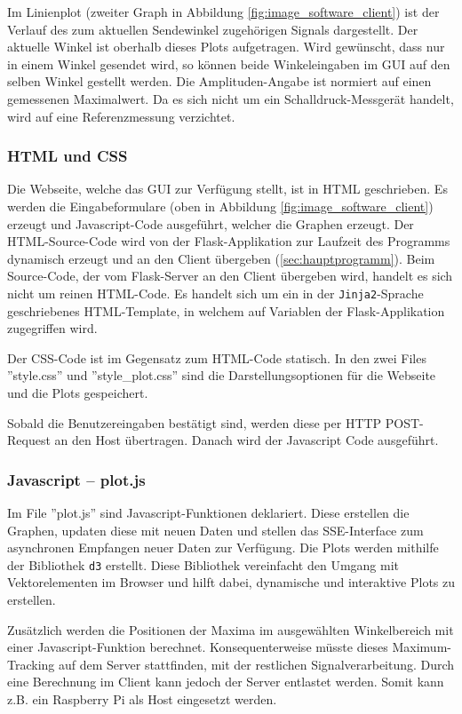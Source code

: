 Im Linienplot (zweiter Graph in Abbildung \ref{fig:image_software_client}) ist der Verlauf des zum aktuellen Sendewinkel zugehörigen Signals dargestellt. Der aktuelle Winkel ist oberhalb dieses Plots aufgetragen. Wird gewünscht, dass nur in einem Winkel gesendet wird, so können beide Winkeleingaben im GUI auf den selben Winkel gestellt werden. Die Amplituden-Angabe ist normiert auf einen gemessenen Maximalwert. Da es sich nicht um ein Schalldruck-Messgerät handelt, wird auf eine Referenzmessung verzichtet.

\subsubsection{HTML und CSS}\label{sec:html_und_css}
Die Webseite, welche das GUI zur Verfügung stellt, ist in HTML geschrieben. Es werden die Eingabeformulare (oben in Abbildung \ref{fig:image_software_client}) erzeugt und Javascript-Code ausgeführt, welcher die Graphen erzeugt.
Der HTML-Source-Code wird von der Flask-Applikation zur Laufzeit des Programms dynamisch erzeugt und an den Client übergeben (\ref{sec:hauptprogramm}). Beim Source-Code, der vom Flask-Server an den Client übergeben wird, handelt es sich nicht um reinen HTML-Code. Es handelt sich um ein in der \texttt{Jinja2}-Sprache geschriebenes HTML-Template, in welchem auf Variablen der Flask-Applikation zugegriffen wird.

Der CSS-Code ist im Gegensatz zum HTML-Code statisch. In den zwei Files ''style.css'' und ''style\_plot.css'' sind die Darstellungsoptionen für die Webseite und die Plots gespeichert.

Sobald die Benutzereingaben bestätigt sind, werden diese per HTTP POST-Request an den Host übertragen. Danach wird der Javascript Code ausgeführt.

\subsubsection{Javascript -- plot.js}\label{sec:javascript}
Im File ''plot.js'' sind Javascript-Funktionen deklariert. Diese erstellen die Graphen, updaten diese mit neuen Daten und stellen das SSE-Interface zum asynchronen Empfangen neuer Daten zur Verfügung. Die Plots werden mithilfe der Bibliothek \texttt{d3} erstellt. Diese Bibliothek vereinfacht den Umgang mit Vektorelementen im Browser und hilft dabei, dynamische und interaktive Plots zu erstellen.

Zusätzlich werden die Positionen der Maxima im ausgewählten Winkelbereich mit einer Javascript-Funktion berechnet. Konsequenterweise müsste dieses Maximum-Tracking auf dem Server stattfinden, mit der restlichen Signalverarbeitung. Durch eine Berechnung im Client kann jedoch der Server entlastet werden. Somit kann z.B. ein Raspberry Pi als Host eingesetzt werden.

